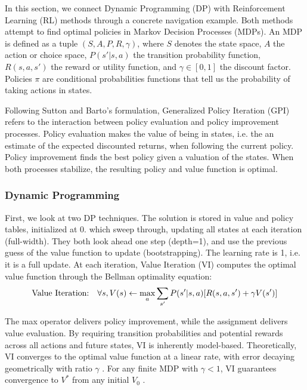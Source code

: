 In this section, we connect Dynamic Programming (DP) with Reinforcement Learning (RL) methods through a concrete navigation example. Both methods attempt to find optimal policies in Markov Decision Processes (MDPs). An MDP is defined as a tuple $(S, A, P, R, \gamma)$, where $S$ denotes the state space, $A$ the action or choice space, $P(s'|s,a)$ the transition probability function, $R(s,a,s')$ the reward or utility function, and $\gamma \in [0,1]$ the discount factor. Policies $\pi$ are conditional probabilities functions that tell us the probability of taking actions in states. 

Following Sutton and Barto's formulation, Generalized Policy Iteration (GPI) refers to the interaction between policy evaluation and policy improvement processes. Policy evaluation makes the value of being in states, i.e. the an estimate of the expected discounted returns, when following the current policy. Policy improvement finds the best policy given a valuation of the states. When both processes stabilize, the resulting policy and value function is optimal.

\subsubsection{Dynamic Programming}

First, we look at two DP techniques. The solution is stored in value and policy tables, initialized at 0. which sweep through, updating all states at each iteration (full-width). They both look ahead one step (depth=1), and use the previous guess of the value function to update (bootstrapping). The learning rate is 1, i.e. it is a full update. At each iteration, Value Iteration (VI) computes the optimal value function through the Bellman optimality equation:
\begin{equation}
\text{Value Iteration:\quad} \forall s, V(s) \leftarrow \max_a \sum_{s'} P(s'|s,a)[R(s,a,s') + \gamma V(s')]
\end{equation}

The max operator delivers policy improvement, while the assignment delivers value evaluation. By requiring transition probabilities and potential rewards across all actions and future states, VI is inherently model-based. Theoretically, VI converges to the optimal value function at a linear rate, with error decaying geometrically with ratio $\gamma$ \cite{bertsekas1996}. For any finite MDP with $\gamma < 1$, VI guarantees convergence to $V^*$ from any initial $V_0$ \cite{sutton2018}.

